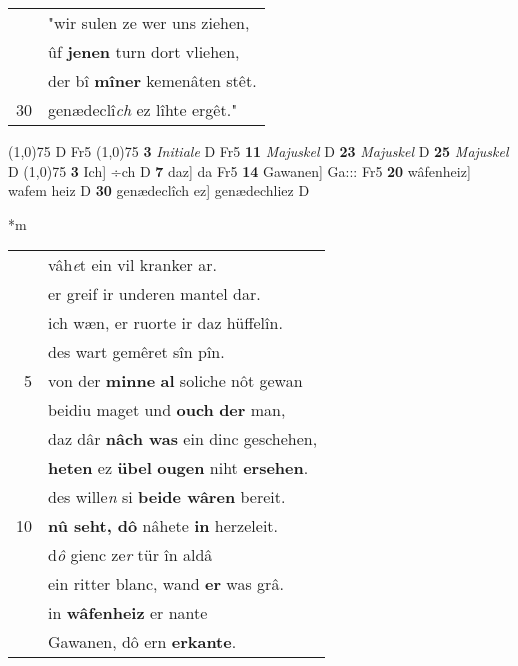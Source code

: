\documentclass[8pt,a4paper,notitlepage]{article}
\begin{document}
\begin{table}[ht]
\begin{minipage}[t]{0.5\linewidth}
\begin{tabular}{rl}
 & "wir sulen ze wer uns ziehen,\\ 
 & ûf \textbf{jenen} turn dort vliehen,\\ 
 & der bî \textbf{mîner} kemenâten stêt.\\ 
30 & genædeclî\textit{ch} ez lîhte ergêt."\\ 
\end{tabular}
\scriptsize
\line(1,0){75} \newline
D Fr5 \newline
\line(1,0){75} \newline
\textbf{3} \textit{Initiale} D Fr5  \textbf{11} \textit{Majuskel} D  \textbf{23} \textit{Majuskel} D  \textbf{25} \textit{Majuskel} D  \newline
\line(1,0){75} \newline
\textbf{3} Ich] ÷ch D \textbf{7} daz] da Fr5 \textbf{14} Gawanen] Ga::: Fr5 \textbf{20} wâfenheiz] wafem heiz D \textbf{30} genædeclîch ez] genædechliez D \newline
\end{minipage}
\hspace{0.5cm}
\begin{minipage}[t]{0.5\linewidth}
\small
\begin{center}*m
\end{center}
\begin{tabular}{rl}
 & vâh\textit{e}t ein vil kranker ar.\\ 
 & er greif ir underen mantel dar.\\ 
 & ich wæn, er ruorte ir daz hüffelîn.\\ 
 & des wart gemêret sîn pîn.\\ 
5 & von der \textbf{minne} \textbf{al} soliche nôt gewan\\ 
 & beidiu maget und \textbf{ouch} \textbf{der} man,\\ 
 & daz dâr \textbf{nâch was} ein dinc geschehen,\\ 
 & \textbf{heten} ez \textbf{übel} \textbf{ougen} niht \textbf{ersehen}.\\ 
 & des wille\textit{n} si \textbf{beide wâren} bereit.\\ 
10 & \textbf{nû seht, dô} nâhete \textbf{in} herzeleit.\\ 
 & d\textit{ô} gienc ze\textit{r} tür în aldâ\\ 
 & ein ritter blanc, wand \textbf{er} was grâ.\\ 
 & in \textbf{wâfenheiz} er nante\\ 
 & Gawanen, dô ern \textbf{erkante}.\\ 

\end{tabular}
\end{minipage}
\end{table}
\end{document}
